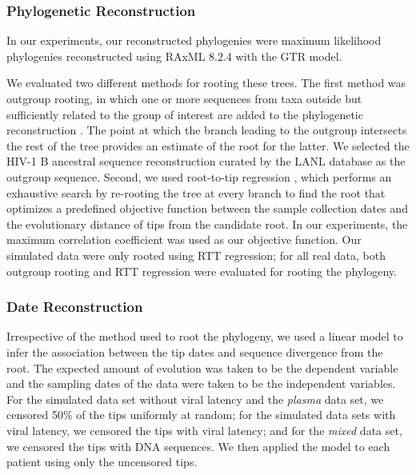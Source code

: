 \documentclass[12pt]{article}
\begin{document}
\subsubsection * {Phylogenetic Reconstruction} \label{subsec:phylo}
In our experiments, our reconstructed phylogenies were maximum likelihood phylogenies reconstructed using RAxML 8.2.4 \citep{Raxml14} with the GTR model.

We evaluated two different methods for rooting these trees. 
The first method was outgroup rooting, in which one or more sequences from taxa outside but sufficiently related to the group of interest are added to the phylogenetic reconstruction \citep{Huelsenbeck02}.
The point at which the branch leading to the outgroup intersects the rest of the tree provides an estimate of the root for the latter.
We selected the HIV-1 B ancestral sequence reconstruction curated by the LANL database \citep{LosAlamos} as the outgroup sequence.
Second, we used root-to-tip regression \citep[RTT;][]{Korber00}, which performs an exhaustive search by re-rooting the tree at every branch to find the root that optimizes a predefined objective function between the sample collection dates and the evolutionary distance of tips from the candidate root.
In our experiments, the maximum correlation coefficient was used as our objective function.
Our simulated data were only rooted using RTT regression; for all real data, both outgroup rooting and RTT regression were evaluated for rooting the phylogeny.


\subsubsection * {Date Reconstruction} \label{subsec:daterecon}

Irrespective of the method used to root the phylogeny, we used a linear model to infer the association between the tip dates and sequence divergence from the root. 
The expected amount of evolution was taken to be the dependent variable and the sampling dates of the data were taken to be the independent variables.
For the simulated data set without viral latency and the \emph{plasma} data set, we censored 50\% of the tips uniformly at random; for the simulated data sets with viral latency, we censored the tips with viral latency; and for the \emph{mixed} data set, we censored the tips with DNA sequences.
We then applied the model to each patient using only the uncensored tips.
\end{document}
